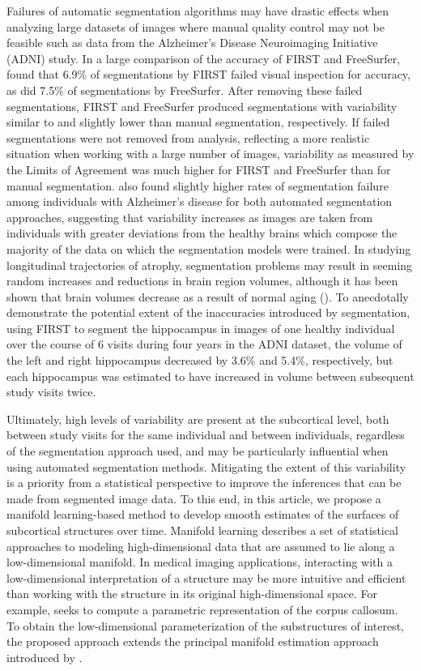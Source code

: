 \documentclass[11pt,reqno]{article}
\theoremstyle{definition}
\begin{document}
Failures of automatic segmentation algorithms may have drastic effects when analyzing large datasets of images where manual quality control may not be feasible such as data from the Alzheimer's Disease Neuroimaging Initiative (ADNI) study. In a large comparison of the accuracy of FIRST and FreeSurfer, \cite{mulderHippocampalVolumeChange2014} found that 6.9\% of segmentations by FIRST failed visual inspection for accuracy, as did 7.5\% of segmentations by FreeSurfer. After removing these failed segmentations, FIRST and FreeSurfer produced segmentations with variability similar to and slightly lower than manual segmentation, respectively. If failed segmentations were not removed from analysis, reflecting a more realistic situation when working with a large number of images, variability as measured by the Limits of Agreement was much higher for FIRST and FreeSurfer than for manual segmentation. \cite{mulderHippocampalVolumeChange2014} also found slightly higher rates of segmentation failure among individuals with Alzheimer's disease for both automated segmentation approaches, suggesting that variability increases as images are taken from individuals with greater deviations from the healthy brains which compose the majority of the data on which the segmentation models were trained. In studying longitudinal trajectories of atrophy, segmentation problems may result in seeming random increases and reductions in brain region volumes, although it has been shown that brain volumes decrease as a result of normal aging (\cite{scahill2003longitudinal}). To anecdotally demonstrate the potential extent of the inaccuracies introduced by segmentation, using FIRST to segment the hippocampus in images of one healthy individual over the course of 6 visits during four years in the ADNI dataset, the volume of the left and right hippocampus decreased by 3.6\% and 5.4\%, respectively, but each hippocampus was estimated to have increased in volume between subsequent study visits twice. 

Ultimately, high levels of variability are present at the subcortical level, both between study visits for the same individual and between individuals, regardless of the segmentation approach used, and may be particularly influential when using automated segmentation methods. Mitigating the extent of this variability is a priority from a statistical perspective to improve the inferences that can be made from segmented image data. To this end, in this article, we propose a manifold learning-based method to develop smooth estimates of the surfaces of subcortical structures over time. Manifold learning describes a set of statistical approaches to modeling high-dimensional data that are assumed to lie along a low-dimensional manifold. In medical imaging applications, interacting with a low-dimensional interpretation of a structure may be more intuitive and efficient than working with the structure in its original high-dimensional space. For example, \cite{yueParameterizationWhiteMatter2016} seeks to compute a parametric representation of the corpus callosum. To obtain the low-dimensional parameterization of the substructures of interest, the proposed approach extends the principal manifold estimation approach introduced by \cite{mengPrincipalManifoldEstimation2021}.
\end{document}
